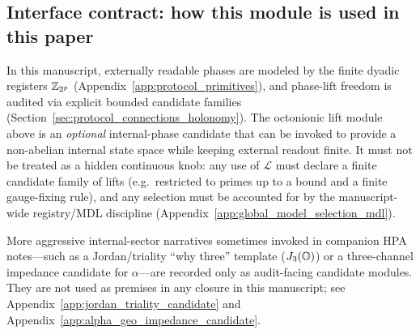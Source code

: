 \subsection{Interface contract: how this module is used in this paper}
\label{subsec:octonion_module_contract}

\begin{remark}
\AuditTag In this manuscript, externally readable phases are modeled by the finite dyadic registers $\mathbb{Z}_{2^p}$ (Appendix~\ref{app:protocol_primitives}), and phase-lift freedom is audited via explicit bounded candidate families (Section~\ref{sec:protocol_connections_holonomy}).
The octonionic lift module above is an \emph{optional} internal-phase candidate that can be invoked to provide a non-abelian internal state space while keeping external readout finite.
It must not be treated as a hidden continuous knob: any use of $\mathcal{L}$ must declare a finite candidate family of lifts (e.g.\ restricted to primes up to a bound and a finite gauge-fixing rule), and any selection must be accounted for by the manuscript-wide registry/MDL discipline (Appendix~\ref{app:global_model_selection_mdl}).
\end{remark}

\begin{remark}
\AuditTag More aggressive internal-sector narratives sometimes invoked in companion HPA notes---such as a Jordan/triality ``why three'' template ($J_3(\mathbb{O})$) or a three-channel impedance candidate for $\alpha$---are recorded only as audit-facing candidate modules.
They are not used as premises in any closure in this manuscript; see Appendix~\ref{app:jordan_triality_candidate} and Appendix~\ref{app:alpha_geo_impedance_candidate}.
\end{remark}
